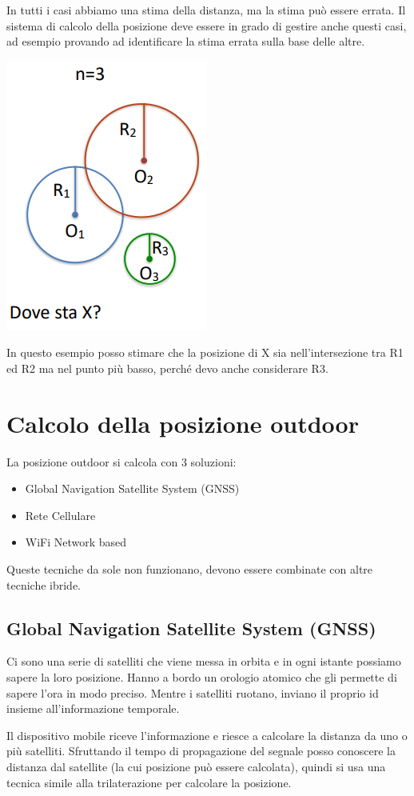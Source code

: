 In tutti i casi abbiamo una stima della distanza, ma la stima può essere errata. 
Il sistema di calcolo della posizione deve essere in grado di gestire anche questi casi, ad esempio provando ad identificare la stima errata sulla base delle altre. 
\begin{center}
    \includegraphics[width=.3\textwidth]{images/Mobile computing/4. Posizione/stima errata.PNG}
\end{center}
In questo esempio posso stimare che la posizione di X sia nell'intersezione tra R1 ed R2 ma nel punto più basso, perché devo anche considerare R3. 

\section{Calcolo della posizione outdoor}
La posizione outdoor si calcola con 3 soluzioni: 
\begin{itemize}
    \item Global Navigation Satellite System (GNSS) 
    \item Rete Cellulare 
    \item WiFi Network based
\end{itemize}
Queste tecniche da sole non funzionano, devono essere combinate con altre tecniche ibride.

\subsection{Global Navigation Satellite System (GNSS) }
Ci sono una serie di satelliti che viene messa in orbita e in ogni istante possiamo sapere la loro posizione.
Hanno a bordo un orologio atomico che gli permette di sapere l'ora in modo preciso.
Mentre i satelliti ruotano, inviano il proprio id insieme all'informazione temporale. 

Il dispositivo mobile riceve l'informazione e riesce a calcolare la distanza da uno o più satelliti. Sfruttando il tempo di propagazione del segnale posso conoscere la distanza dal satellite (la cui posizione può essere calcolata), quindi si usa una tecnica simile alla trilaterazione per calcolare la posizione.

